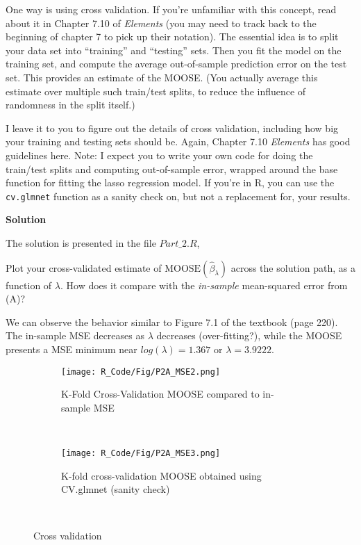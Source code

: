 \documentclass[11 pt]{article}
\begin{document}
\begin{enumerate}[label=(\Alph*)]
One way is using cross validation.  If you're unfamiliar with this concept, read about it in Chapter 7.10 of \textit{Elements} (you may need to track back to the beginning of chapter 7 to pick up their notation).  The essential idea is to split your data set into ``training'' and ``testing'' sets.  Then you fit the model on the training set, and compute the average out-of-sample prediction error on the test set.  This provides an estimate of the MOOSE.  (You actually average this estimate over multiple such train/test splits, to reduce the influence of randomness in the split itself.)

I leave it to you to figure out the details of cross validation, including how big your training and testing sets should be.  Again, Chapter 7.10 \textit{Elements} has good guidelines here.  Note: I expect you to write your own code for doing the train/test splits and computing out-of-sample error, wrapped around the base function for fitting the lasso regression model.   If you're in R, you can use the \verb|cv.glmnet| function as a sanity check on, but not a replacement for, your results.


\newpage
\textbf{Solution}

The solution is presented in the file $Part\_2.R$,


Plot your cross-validated estimate of $\mathrm{MOOSE}(\hat{\beta}_{\lambda})$ across the solution path, as a function of $\lambda$.  How does it compare with the \textit{in-sample} mean-squared error from (A)?

We can observe the behavior similar to Figure 7.1 of the textbook (page 220). The in-sample MSE decreases as $\lambda$ decreases (over-fitting?), while the MOOSE presents a MSE minimum near $log(\lambda)=1.367$ or $\lambda=3.9222$.

\begin{figure}[H]
	\begin{center}
		\begin{subfigure}[h]{0.6\linewidth}
			\texttt{[image: R\_Code/Fig/P2A\_MSE2.png]}
			\caption{K-Fold Cross-Validation MOOSE compared to in-sample MSE}
		\end{subfigure}\\
		\begin{subfigure}[h]{0.6\linewidth}
			\texttt{[image: R\_Code/Fig/P2A\_MSE3.png]}
			\caption{K-fold cross-validation MOOSE obtained using CV.glmnet (sanity check)}
		\end{subfigure}\\
		\caption{Cross validation}
		\label{fig:Fig1}
	\end{center}
\end{figure}



\end{enumerate}
\end{document}
